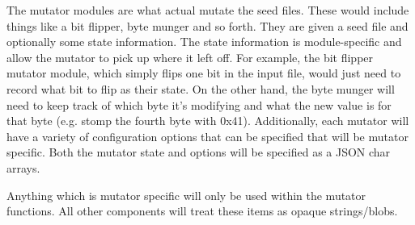 The mutator modules are what actual mutate the seed files.  These would include
things like a bit flipper, byte munger and so forth.  They are given a seed file
and optionally some state information.  The state information is module-specific
and allow the mutator to pick up where it left off.  For example, the bit
flipper mutator module, which simply flips one bit in the input file, would just
need to record what bit to flip as their state.  On the other hand, the byte
munger will need to keep track of which byte it's modifying and what the new
value is for that byte (e.g.  stomp the fourth byte with 0x41).  Additionally,
each mutator will have a variety of configuration options that can be specified
that will be mutator specific.  Both the mutator state and options will be
specified as a JSON char arrays.

\par
Anything which is mutator specific will only be used within the mutator
functions.  All other components will treat these items as opaque strings/blobs.




